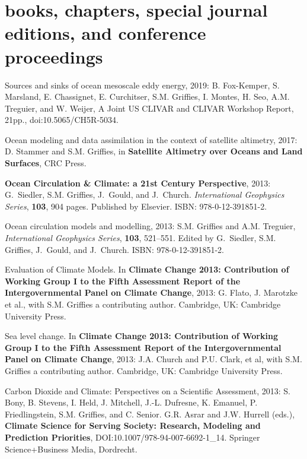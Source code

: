 \section*{\sc \color{Maroon} books, chapters, special journal editions, and conference proceedings}


\begin{etaremune}


\item Sources and sinks of ocean mesoscale eddy energy, 2019: B. Fox-Kemper,  S. Marsland, E. Chassignet, E. Curchitser, S.M. Grif\/f\/ies, I. Montes, H. Seo, A.M. Treguier, and W. Weijer, A Joint US CLIVAR and CLIVAR Workshop Report, 21pp., doi:10.5065/CH5R-5034.

\item Ocean modeling and data assimilation in the context of satellite altimetry, 2017: D. Stammer and S.M. Grif\/f\/ies, in  {\bf Satellite Altimetry over Oceans and Land Surfaces}, CRC Press.
  
\item {\bf Ocean Circulation \& Climate: a 21st Century Perspective}, 2013: G.\ Siedler, S.M. Grif\/f\/ies, J.\ Gould, and J.\ Church.
  {\it International Geophysics Series}, {\bf 103}, 904 pages. Published by Elsevier.  ISBN: 978-0-12-391851-2.

\item Ocean circulation models and modelling, 2013: S.M. Grif\/f\/ies and A.M. Treguier, {\it International Geophysics Series}, {\bf 103}, 521--551.  Edited by G.\ Siedler, S.M. Grif\/f\/ies, J.\ Gould, and J.\ Church.  ISBN:
  978-0-12-391851-2.

\item Evaluation of Climate Models.  In {\bf Climate Change 2013: Contribution of Working Group I to the Fifth Assessment Report of
    the Intergovernmental Panel on Climate Change}, 2013: G. Flato,
  J. Marotzke et al., with S.M. Grif\/f\/ies a contributing author. Cambridge, UK: Cambridge University Press.

\item Sea level change.  In {\bf Climate Change 2013: Contribution of Working Group I to the Fifth Assessment Report of the Intergovernmental Panel on Climate Change}, 2013: J.A. Church and P.U. Clark, et al, with S.M. Grif\/f\/ies a contributing author.  Cambridge, UK: Cambridge University Press.

\item Carbon Dioxide and Climate: Perspectives on a Scientific
  Assessment, 2013: S. Bony, B. Stevens, I. Held, J. Mitchell,
  J.-L. Dufresne, K. Emanuel, P. Friedlingstein, S.M. Grif\/f\/ies, and C. Senior. G.R. Asrar and J.W. Hurrell
  (eds.), {\bf Climate Science for Serving Society: Research, Modeling and Prediction Priorities}, DOI:10.1007/978-94-007-6692-1\_14.
  Springer Science+Business Media, Dordrecht.


\end{etaremune}
